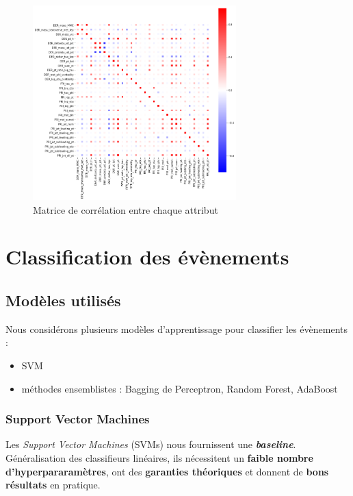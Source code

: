 \documentclass[12pt]{article}
\begin{document}
\begin{figure}[H]
    \center
    \includegraphics[width=0.7\textwidth]{images/correlation_matrix.png}
    \caption{Matrice de corrélation entre chaque attribut}
    \label{img:corr-mat}
\end{figure}

\section{Classification des évènements}

\subsection{Modèles utilisés}

Nous considérons plusieurs modèles d'apprentissage pour classifier les
évènements :

\begin{itemize}
    \item SVM
    \item méthodes ensemblistes : Bagging de Perceptron, Random Forest, AdaBoost
\end{itemize}

\subsubsection{Support Vector Machines}

Les \emph{Support Vector Machines} (SVMs) nous fournissent une
\textbf{\emph{baseline}}. Généralisation des classifieurs linéaires, ils
nécessitent un \textbf{faible nombre d'hyperpararamètres}, ont des
\textbf{garanties théoriques} et donnent de \textbf{bons résultats} en pratique.
\end{document}
